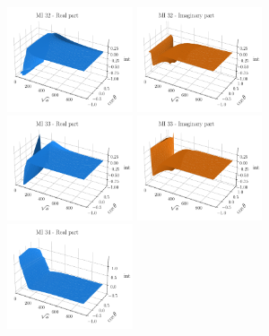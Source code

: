 \documentclass[11pt,a4paper]{article}
\begin{document}
\begin{figure}[!ht]
\begin{center}
\includegraphics[width=0.33\textwidth]{plots/plotMI32.pdf}\hspace{2cm}
\includegraphics[width=0.33\textwidth]{plots/plotMI32im.pdf}\\\vspace{-0.1cm}
\includegraphics[width=0.33\textwidth]{plots/plotMI33.pdf}\hspace{2cm}
\includegraphics[width=0.33\textwidth]{plots/plotMI33im.pdf}\\\vspace{-0.1cm}
\includegraphics[width=0.33\textwidth]{plots/plotMI34.pdf}\hspace{2cm}

\end{center}
\end{figure}
\end{document}
